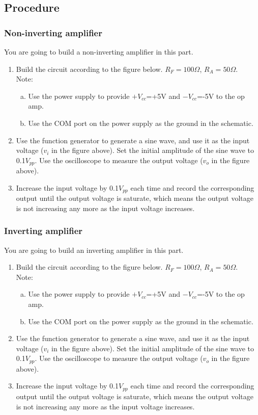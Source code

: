 \documentclass{article}
\begin{document}
\subsection{Procedure}

\subsubsection{Non-inverting amplifier}
You are going to build a non-inverting amplifier in this part.
\begin{enumerate}
\item
Build the circuit according to the figure below. $R_F =100\Omega$, $R_A=50\Omega$.\\
Note:
\begin{enumerate}[(a)]
\item
Use the power supply to provide $+V_{cc}$=+5V and $-V_{cc}$=-5V to the op amp.
\item
Use the COM port on the power supply as the ground in the schematic.
\end{enumerate}
\item
Use the function generator to generate a sine wave, and use it as the input voltage ($v_i$ in the figure above). Set the initial amplitude of the sine wave to 0.1$V_{pp}$. Use the oscilloscope to measure the output voltage ($v_o$ in the figure above).
\item
Increase the input voltage by 0.1$V_{pp}$ each time and record the corresponding output until the output voltage is saturate, which means the output voltage is not increasing any more as the input voltage increases.
\end{enumerate}

\subsubsection{Inverting amplifier}
You are going to build an inverting amplifier in this part.
\begin{enumerate}
\item
Build the circuit according to the figure below. $R_F =100\Omega$, $R_A=50\Omega$.\\
Note:
\begin{enumerate}[(a)]
\item
Use the power supply to provide $+V_{cc}$=+5V and $-V_{cc}$=-5V to the op amp.
\item
Use the COM port on the power supply as the ground in the schematic.
\end{enumerate}
\item
Use the function generator to generate a sine wave, and use it as the input voltage ($v_i$ in the figure above). Set the initial amplitude of the sine wave to 0.1$V_{pp}$. Use the oscilloscope to measure the output voltage ($v_o$ in the figure above).
\item
Increase the input voltage by 0.1$V_{pp}$ each time and record the corresponding output until the output voltage is saturate, which means the output voltage is not increasing any more as the input voltage increases.
\end{enumerate}
\end{document}
